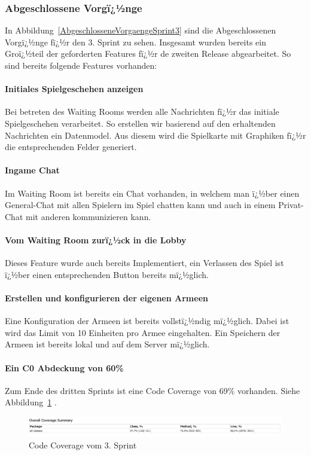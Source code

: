 \documentclass[12pt, titlepage]{scrartcl}
\newcommand{\Abb}[1]{%
	Abbildung\ \ref{#1}%
}
\begin{document}
		\subsubsection{Abgeschlossene Vorgï¿½nge}
		
		In \Abb{AbgeschlosseneVorgaengeSprint3} sind die Abgeschlossenen Vorgï¿½nge fï¿½r den 3. Sprint zu sehen. Insgesamt wurden bereits ein Groï¿½teil der geforderten Features fï¿½r de zweiten Release abgearbeitet. So sind bereits folgende Features vorhanden:
		
		\paragraph{Initiales Spielgeschehen anzeigen} Bei betreten des Waiting Rooms werden alle Nachrichten fï¿½r das initiale Spielgeschehen verarbeitet. So erstellen wir basierend auf den erhaltenden Nachrichten ein Datenmodel. Aus diesem wird die Spielkarte mit Graphiken fï¿½r die entsprechenden Felder generiert.
		
		\paragraph{Ingame Chat}
		Im Waiting Room ist bereits ein Chat vorhanden, in welchem man ï¿½ber einen General-Chat mit allen Spielern im Spiel chatten kann und auch in einem Privat-Chat mit anderen kommunizieren kann.
		
		\paragraph{Vom Waiting Room zurï¿½ck in die Lobby}
		Dieses Feature wurde auch bereits Implementiert, ein Verlassen des Spiel ist ï¿½ber einen entsprechenden Button bereits mï¿½glich.
		
		\paragraph{Erstellen und konfigurieren der eigenen Armeen}
		Eine Konfiguration der Armeen ist bereits vollstï¿½ndig mï¿½glich. Dabei ist wird das Limit von 10 Einheiten pro Armee eingehalten. Ein Speichern der Armeen ist bereits lokal und auf dem Server mï¿½glich.
		
		\paragraph{Ein C0 Abdeckung von 60\%}
		Zum Ende des dritten Sprints ist eine Code Coverage von 69\% vorhanden. Siehe \Abb{CodeCoverageSprint3}.
		\begin{figure}[H] 
			\centering
			\includegraphics[width=1\textwidth]{Coverage_Sprint_3.PNG}
			\caption{Code Coverage vom 3. Sprint}
			\label{CodeCoverageSprint3}
		\end{figure}
		
\end{document}
